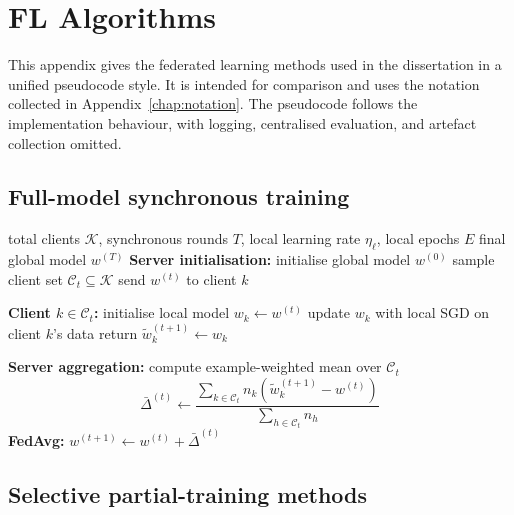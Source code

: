 \chapter[Federated Training Algorithms]{FL Algorithms}
\label{appendix:algorithms}

This appendix gives the federated learning methods used in the dissertation in a unified pseudocode style. It is intended for comparison and uses the notation collected in Appendix~\ref{chap:notation}. The pseudocode follows the implementation behaviour, with logging, centralised evaluation, and artefact collection omitted.


\section{Full-model synchronous training}

\begin{algorithm}[H]
\caption{\textcolor{fedavggreen}{\texttt{FedAvg}}}
\label{alg:fedavg}
\begin{algorithmic}[1]
\Require total clients $\mathcal{K}$, synchronous rounds $T$, local learning rate $\eta_\ell$, local epochs $E$
\Ensure final global model $w^{(T)}$
\Statex \textbf{Server initialisation:}
\State initialise global model $w^{(0)}$
    \State sample client set $\mathcal{C}_t \subseteq \mathcal{K}$
        \State send $w^{(t)}$ to client $k$
    \EndFor

    \Statex
    \Statex \hspace{1em}\textbf{Client $k \in \mathcal{C}_t$:}
    \State initialise local model $w_k \gets w^{(t)}$
        \State update $w_k$ with local SGD on client $k$'s data
    \EndFor
    \State return $\tilde{w}_k^{(t+1)} \gets w_k$

    \Statex
    \Statex \textbf{Server aggregation:}
    \State compute example-weighted mean over $\mathcal{C}_t$
    \[
        \bar{\Delta}^{(t)} \gets
        \frac{\sum_{k \in \mathcal{C}_t} n_k\left(\tilde{w}_k^{(t+1)} - w^{(t)}\right)}
             {\sum_{h \in \mathcal{C}_t} n_h}
    \]
    \State \textcolor{fedavggreen}{\textbf{FedAvg:} \hspace{0.4em} $w^{(t+1)} \gets w^{(t)} + \bar{\Delta}^{(t)}$}
\EndFor
\end{algorithmic}
\end{algorithm}

\section{Selective partial-training methods}

